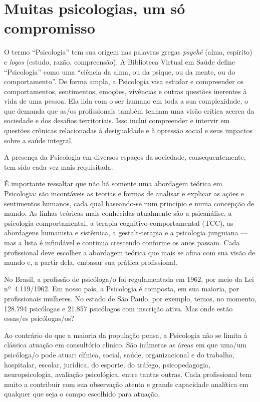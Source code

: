 \documentclass[a5paper, twoside, symmetric, nohyper]{tufte-book}
\begin{document}
\chapter{Muitas psicologias, um só compromisso}

O termo ``Psicologia'' tem sua origem nas palavras gregas \emph{psyché}
(alma, espírito) e \emph{logos} (estudo, razão, compreensão). A
Biblioteca Virtual em Saúde define ``Psicologia'' como uma ``ciência da
alma, ou da psique, ou da mente, ou do comportamento''. De forma ampla,
a Psicologia visa estudar e compreender os comportamentos, sentimentos,
emoções, vivências e outras questões inerentes à vida de uma pessoa. Ela
lida com o ser humano em toda a sua complexidade, o que demanda que
as/os profissionais também tenham uma visão crítica acerca da sociedade
e dos desafios territoriais. Isso inclui compreender e intervir em
questões crônicas relacionadas à desigualdade e à opressão social e seus
impactos sobre a saúde integral.

A presença da Psicologia em diversos espaços da sociedade,
consequentemente, tem sido cada vez mais requisitada.

É importante ressaltar que não há somente uma abordagem teórica em
Psicologia: são incontáveis as teorias e formas de analisar e explicar
as ações e sentimentos humanos, cada qual baseando-se num princípio e
numa concepção de mundo. As linhas teóricas mais conhecidas atualmente
são a psicanálise, a psicologia comportamental, a terapia
cognitivo-comportamental (TCC), as abordagens humanista e sistêmica, a
gestalt-terapia e a psicologia junguiana --- mas a lista é infindável e
continua crescendo conforme os anos passam. Cada profissional deve
escolher a abordagem teórica que mais se afina com sua visão de mundo e,
a partir dela, embasar sua prática profissional.

No Brasil, a profissão de psicóloga/o foi regulamentada em 1962, por
meio da Lei nº~4.119/1962. Em nosso país, a Psicologia é composta, em
sua maioria, por profissionais mulheres. No estado de São Paulo, por
exemplo, temos, no momento, 128.794 psicólogas e 21.857 psicólogos com
inscrição ativa. Mas onde estão essas/es psicólogas/os?

Ao contrário do que a maioria da população pensa, a Psicologia não se
limita à clássica atuação em consultório clínico. São inúmeras as áreas
em que uma/um psicóloga/o pode atuar: clínica, social, saúde,
organizacional e do trabalho, hospitalar, escolar, jurídica, do esporte,
do tráfego, psicopedagogia, neuropsicologia, avaliação psicológica,
entre tantas outras. Cada profissional tem muito a contribuir com sua
observação atenta e grande capacidade analítica em qualquer que seja o
campo escolhido para atuação.
\end{document}
